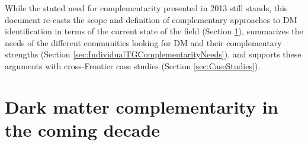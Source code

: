 \documentclass[nofootinbib]{article}
\begin{document}

While the stated need for complementarity presented in 2013 still stands, this document %
re-casts the scope and definition of complementary approaches to DM identification in terms of the current state of the field (Section \ref{sec:DMComplementarity}), 
 summarizes the needs of the different communities looking for DM and their complementary strengths (Section \ref{sec:IndividualTGComplementarityNeeds}),
and supports  these arguments with cross-Frontier case studies (Section \ref{sec:CaseStudies}). 

\section{Dark matter complementarity in the coming decade}
\label{sec:DMComplementarity}

\end{document}
